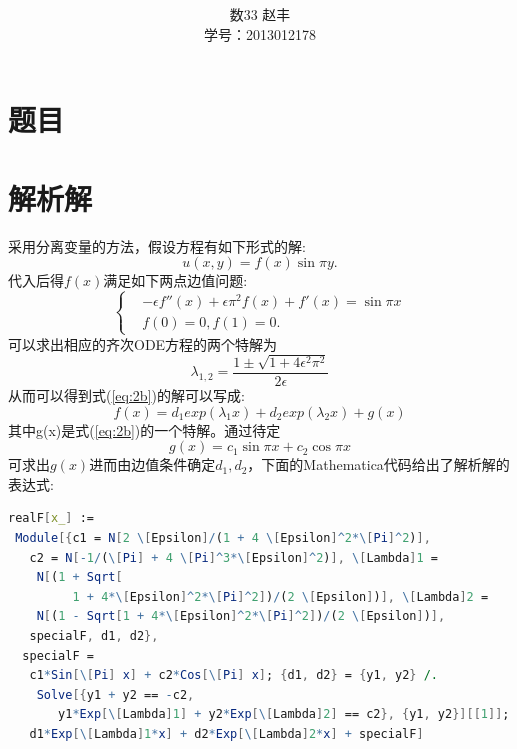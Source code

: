 \documentclass[12pt]{article}
\theoremstyle{remark}
\begin{document}
\title{\textbf{}}
\author{数33 赵丰 \\学号：2013012178}
\maketitle
\large
\section{题目}

\section{解析解}
采用分离变量的方法，假设方程有如下形式的解:
\begin{equation}\label{eq:fx}
u(x,y)=f(x)\sin \pi y.
\end{equation}
代入后得$f(x)$满足如下两点边值问题:
\begin{equation}\label{eq:2b}
\begin{cases}
&-\epsilon f''(x)+\epsilon \pi^2 f(x)+f'(x)=\sin \pi x\\
&f(0)=0,f(1)=0.
\end{cases}
\end{equation}
可以求出相应的齐次ODE方程的两个特解为
\begin{equation}
\lambda_{1,2}=\frac{1\pm \sqrt{1+4\epsilon^2\pi^2}}{2\epsilon}
\end{equation}
从而可以得到式(\ref{eq:2b})的解可以写成:
\begin{equation}
f(x)=d_1 exp(\lambda_1 x)+d_2 exp(\lambda_2 x)+g(x)
\end{equation}
其中g(x)是式(\ref{eq:2b})的一个特解。通过待定
\begin{equation}
g(x)=c_1 \sin \pi x + c_2 \cos \pi x
\end{equation}
可求出$g(x)$进而由边值条件确定$d_1,d_2$，下面的Mathematica代码给出了解析解的表达式:
\begin{lstlisting}[language=Mathematica]
realF[x_] := 
 Module[{c1 = N[2 \[Epsilon]/(1 + 4 \[Epsilon]^2*\[Pi]^2)], 
   c2 = N[-1/(\[Pi] + 4 \[Pi]^3*\[Epsilon]^2)], \[Lambda]1 = 
    N[(1 + Sqrt[
         1 + 4*\[Epsilon]^2*\[Pi]^2])/(2 \[Epsilon])], \[Lambda]2 = 
    N[(1 - Sqrt[1 + 4*\[Epsilon]^2*\[Pi]^2])/(2 \[Epsilon])], 
   specialF, d1, d2}, 
  specialF = 
   c1*Sin[\[Pi] x] + c2*Cos[\[Pi] x]; {d1, d2} = {y1, y2} /. 
    Solve[{y1 + y2 == -c2, 
       y1*Exp[\[Lambda]1] + y2*Exp[\[Lambda]2] == c2}, {y1, y2}][[1]];
   d1*Exp[\[Lambda]1*x] + d2*Exp[\[Lambda]2*x] + specialF]
\end{lstlisting}
\end{document}
